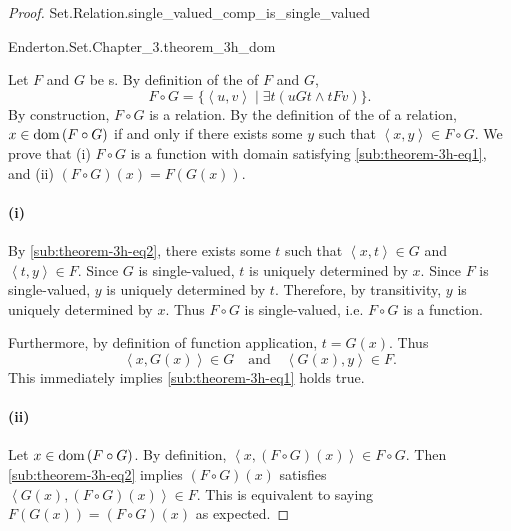 \documentclass{report}
\begin{document}
\begin{proof}

  \statementpadding

    {Set.Relation.single\_valued\_comp\_is\_single\_valued}

    {Enderton.Set.Chapter\_3.theorem\_3h\_dom}

  Let $F$ and $G$ be s.
  By definition of the  of $F$ and $G$,
    \begin{equation}
      \label{sub:theorem-3h-eq2}
      F \circ G = \{\left< u, v \right> \mid \exists t(uGt \land tFv)\}.
    \end{equation}
  By construction, $F \circ G$ is a relation.
  By the definition of the  of a relation,
    $x \in \mathop{\text{dom}}{(F \circ G)}$ if and only if there exists some $y$ such that
    $\left< x, y \right> \in F \circ G$.
  We prove that (i) $F \circ G$ is a function with domain satisfying
    \eqref{sub:theorem-3h-eq1}, and (ii) $(F \circ G)(x) = F(G(x))$.

  \paragraph{(i)}%
  \label{par:theorem-3h-i}

    By \eqref{sub:theorem-3h-eq2}, there exists some $t$ such that
      $\left< x, t \right> \in G$ and $\left< t, y \right> \in F$.
    Since $G$ is single-valued, $t$ is uniquely determined by $x$.
    Since $F$ is single-valued, $y$ is uniquely determined by $t$.
    Therefore, by transitivity, $y$ is uniquely determined by $x$.
    Thus $F \circ G$ is single-valued, i.e. $F \circ G$ is a function.

    Furthermore, by definition of function application, $t = G(x)$.
    Thus
      $$\left< x, G(x) \right> \in G \quad\text{and}\quad
        \left< G(x), y \right> \in F.$$
    This immediately implies \eqref{sub:theorem-3h-eq1} holds true.

  \paragraph{(ii)}%

    Let $x \in \mathop{\text{dom}}{(F \circ G)}$.
    By definition, $\left< x, (F \circ G)(x) \right> \in F \circ G$.
    Then \eqref{sub:theorem-3h-eq2} implies $(F \circ G)(x)$ satisfies
      $\left< G(x), (F \circ G)(x) \right> \in F$.
    This is equivalent to saying $F(G(x)) = (F \circ G)(x)$ as expected.

\end{proof}
\end{document}
